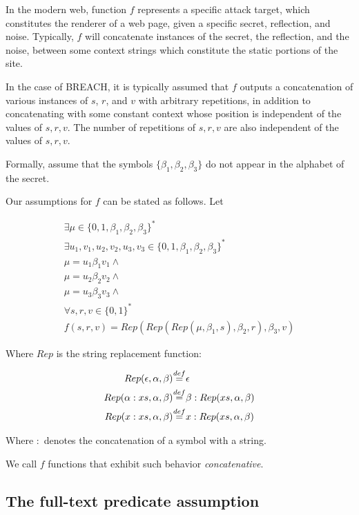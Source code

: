 \documentclass[conference, letterpaper, 10pt]{IEEEtran}
\newcommand\defeq{\stackrel{\mathclap{\normalfont\mbox{def}}}{=}}
\begin{document}
In the modern web, function $f$ represents a specific attack target, which
constitutes the renderer of a web page, given a specific secret, reflection,
and noise. Typically, $f$ will concatenate instances of the secret, the
reflection, and the noise, between some context strings which constitute the
static portions of the site.

In the case of BREACH, it is typically assumed that $f$ outputs a concatenation
of various instances of $s$, $r$, and $v$ with arbitrary repetitions, in
addition to concatenating with some constant context whose position is
independent of the values of $s, r, v$. The number of repetitions of $s, r, v$
are also independent of the values of $s, r, v$.

Formally, assume that the symbols $\{\beta_1, \beta_2, \beta_3\}$ do not appear
in the alphabet of the secret.

Our assumptions for $f$ can be stated as follows. Let

\begin{equation*}
\begin{split}
\exists \mu \in \{0, 1, \beta_1, \beta_2, \beta_3\}^*\\
\exists u_1, v_1, u_2, v_2, u_3, v_3 \in \{0, 1, \beta_1, \beta_2, \beta_3\}^*\\
\mu = u_1 \beta_1 v_1 \land\\
\mu = u_2 \beta_2 v_2 \land\\
\mu = u_3 \beta_3 v_3 \land\\
\forall s, r, v \in \{0, 1\}^*\\
f(s, r, v) = Rep(Rep(Rep(\mu, \beta_1, s), \beta_2, r), \beta_3, v)
\end{split}
\end{equation*}

Where $Rep$ is the string replacement function:

\begin{align*}
Rep(\epsilon, \alpha, \beta) &\defeq \epsilon\\
Rep(\alpha:xs, \alpha, \beta) &\defeq \beta:Rep(xs, \alpha, \beta)\\
Rep(x:xs, \alpha, \beta) &\defeq x:Rep(xs, \alpha, \beta)
\end{align*}

Where $:$ denotes the concatenation of a symbol with a string.

We call $f$ functions that exhibit such behavior \textit{concatenative}.

\subsection{The full-text predicate assumption}\label{subsec:fulltextassumption}
\end{document}
